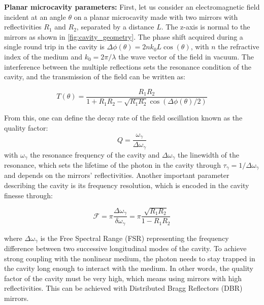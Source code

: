\textbf{Planar microcavity parameters:}
First, let us consider an electromagnetic field incident at an angle $\theta$ on a planar microcavity made with two mirrors with reflectivities $R_1$ and $R_2$, separated by a distance $L$. The z-axis is normal to the mirrors as shown in \autoref{fig:cavity_geometry}. The phase shift acquired during a single round trip in the cavity is $\Delta \phi (\theta)=2nk_0L\cos(\theta)$, with $n$ the refractive index of the medium and $k_0=2\pi/\lambda$ the wave vector of the field in vacuum. The interference between the multiple reflections sets the resonance condition of the cavity, and the transmission of the field can be written as:

\begin{equation}
    T(\theta)=\frac{R_1R_2}{1+R_1R_2-\sqrt{R_1R_2}\cos(\Delta \phi(\theta)/2)}
    \label{eq:transmission_theta}
\end{equation}

\noindent From this, one can define the decay rate of the field oscillation known as the quality factor:
\begin{equation}
    Q=\frac{\omega_\gamma}{\Delta \omega_\gamma}
    \label{eq:Q}
\end{equation}
with $\omega_\gamma$ the resonance frequency of the cavity and $\Delta \omega_\gamma$ the linewidth of the resonance, which sets the lifetime of the photon in the cavity through $\tau_\gamma=1/\Delta \omega_\gamma$ and depends on the mirrors' reflectivities. Another important parameter describing the cavity is its frequency resolution, which is encoded in the cavity finesse through:

\begin{equation}
    \mathcal{F}=\pi \frac{\Delta \omega_\gamma}{\delta \omega_\gamma} = \pi \frac{\sqrt{R_1R_2}}{1-R_1R_2}
    \label{eq:F}
\end{equation}

where $\Delta \omega_\gamma$ is the Free Spectral Range (FSR) representing the frequency difference between two successive longitudinal modes of the cavity. To achieve strong coupling with the nonlinear medium, the photon needs to stay trapped in the cavity long enough to interact with the medium. In other words, the quality factor of the cavity must be very high, which means using mirrors with high reflectivities. This can be achieved with Distributed Bragg Reflectors (DBR) mirrors.

